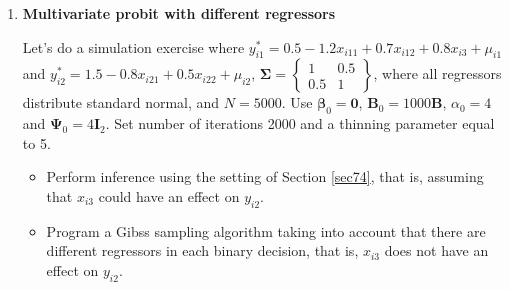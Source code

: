 \begin{enumerate}
\item \textbf{Multivariate probit with different regressors}

Let's do a simulation exercise where $y_{i1}^*=0.5-1.2x_{i11}+0.7x_{i12}+0.8x_{i3}+\mu_{i1}$ and $y_{i2}^*=1.5-0.8x_{i21}+0.5x_{i22}+\mu_{i2}$, $\bm{\Sigma}=\begin{Bmatrix}
	1 & 0.5\\
	0.5 & 1
\end{Bmatrix}$, where all regressors distribute standard normal, and $N=5000$. Use $\bm{\beta}_0=\bm{0}$, $\bm{B}_0=1000\bm{B}$, $\alpha_0=4$ and $\bm{\Psi}_0=4\bm{I}_2$. Set number of iterations 2000 and a thinning parameter equal to 5.  

\begin{itemize}
	\item Perform inference using the setting of Section \ref{sec74}, that is, assuming that $x_{i3}$ could have an effect on $y_{i2}$.
	\item Program a Gibss sampling algorithm taking into account that there are different regressors in each binary decision, that is, $x_{i3}$ does not have an effect on $y_{i2}$. 
\end{itemize}      

\end{enumerate}


